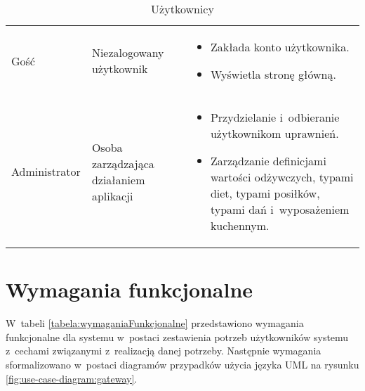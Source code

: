 \begin{minipage}{\textwidth}
    \begin{table}[H]
        \centering\caption{Użytkownicy \source{\ownwork}\label{tabela:uzytkownicy}}
        \begin{tabular}{|P{.15\textwidth}|P{.25\textwidth}|P{.5\textwidth}|}

            \hline
             &  & \\

            \hline
            Gość &
            Niezalogowany użytkownik &
            \begin{itemize}
                \item Zakłada konto użytkownika.
                \item Wyświetla stronę główną.
            \end{itemize} \\
            \hline
            Administrator &
            Osoba zarządzająca działaniem aplikacji &
            \begin{itemize}
                \item Przydzielanie i~odbieranie użytkownikom uprawnień.
                \item Zarządzanie definicjami wartości odżywczych, typami diet, typami posiłków, typami dań i~wyposażeniem kuchennym.
            \end{itemize} \\
            \hline
        \end{tabular}
    \end{table}
\end{minipage}

\section{Wymagania funkcjonalne}\label{sec:functional-requirements}
\par
W~tabeli \ref{tabela:wymaganiaFunkcjonalne}
przedstawiono wymagania funkcjonalne dla systemu w~postaci zestawienia potrzeb użytkowników systemu z~cechami związanymi z~realizacją danej potrzeby.
Następnie wymagania sformalizowano w~postaci diagramów przypadków użycia języka UML na rysunku \ref{fig:use-case-diagram:gateway}.

